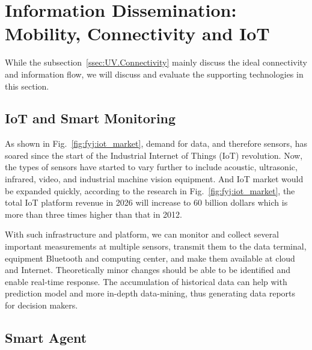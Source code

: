 \documentclass[letterpaper, twocolumn, 10pt, conference]{IEEEtran}
\begin{document}

\section{Information Dissemination: Mobility, Connectivity and IoT}
\label{sec:Information_Dissemination}

While the subsection~\ref{ssec:UV.Connectivity} mainly discuss the ideal connectivity and information flow, we will discuss and evaluate the supporting technologies in this section. 

\subsection{IoT and Smart Monitoring}
\label{ssec:IoTmonitoring}

As shown in Fig.~\ref{fig:fyj:iot_market}, demand for data, and therefore sensors, has soared since the start of the Industrial Internet of Things (IoT) revolution. Now, the types of sensors have started to vary further to include acoustic, ultrasonic, infrared, video, and industrial machine vision equipment.
And IoT market would be expanded quickly, according to the research in Fig.~\ref{fig:fyj:iot_market}, the total IoT platform revenue in 2026 will increase to 60 billion dollars which is more than three times higher than that in 2012.


With such infrastructure and platform, we can monitor and collect several important measurements at multiple sensors, transmit them to the data terminal, equipment Bluetooth and computing center, and make them available at cloud and Internet. Theoretically minor changes should be able to be identified and enable real-time response. The accumulation of historical data can help with prediction model and more in-depth data-mining, thus generating data reports for decision makers.


\subsection{Smart Agent}
\label{ssec:smartagent}
\end{document}
